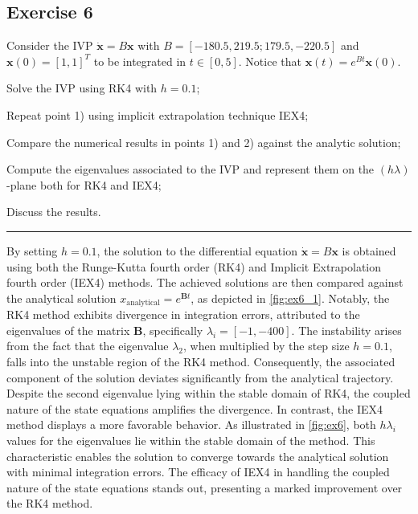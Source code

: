 \documentclass[11pt,a4paper,oneside]{article}
\renewcommand{\vec}[1]{\mathbf{#1}}
\begin{document}
\subsection*{Exercise 6}

Consider the IVP $\dot{\vec x} = B \vec x$ with $B =[-180.5, 219.5; 179.5, -220.5]$ and $\vec{x}(0)=[1, 1]^T$ to be integrated in $t\in[0, 5]$. Notice that $\vec{x}(t)=e^{Bt}\vec{x}(0)$.
\begin{enumerate*}[label=\arabic*)]
    \item Solve the IVP using RK4 with $h=0.1$;
    \item Repeat point 1) using implicit extrapolation technique IEX4;
    \item Compare the numerical results in points 1) and 2) against the analytic solution;
    \item Compute the eigenvalues associated to the IVP and represent them on the $(h\lambda)$-plane both for RK4 and IEX4;
    \item Discuss the results.
\end{enumerate*}

\medskip \hrule \medskip


By setting $h=0.1$, the solution to the differential equation $\dot{\vec x} = B \vec x$ 
is obtained using both the Runge-Kutta fourth order (RK4) and Implicit Extrapolation 
fourth order (IEX4) methods. The achieved solutions are then compared against the 
analytical solution $x_{\text{analytical}}=e^{\vec{B}t}$, as depicted in \autoref{fig:ex6_1}.
Notably, the RK4 method exhibits divergence in integration errors, attributed to the 
eigenvalues of the matrix $\vec{B}$, specifically $\lambda_i= [-1, -400]$. 
The instability arises from the fact that the eigenvalue $\lambda_2$, 
when multiplied by the step size $h=0.1$, falls into the unstable region of 
the RK4 method. Consequently, the associated component of the solution deviates 
significantly from the analytical trajectory. Despite the second eigenvalue lying 
within the stable domain of RK4, the coupled nature of the state equations 
amplifies the divergence. In contrast, the IEX4 method displays a more favorable 
behavior. As illustrated in \autoref{fig:ex6}, both $h\lambda_i$ values for the 
eigenvalues lie within the stable domain of the method. This characteristic enables 
the solution to converge towards the analytical solution with minimal integration 
errors. The efficacy of IEX4 in handling the coupled nature of the state equations 
stands out, presenting a marked improvement over the RK4 method.
\end{document}
